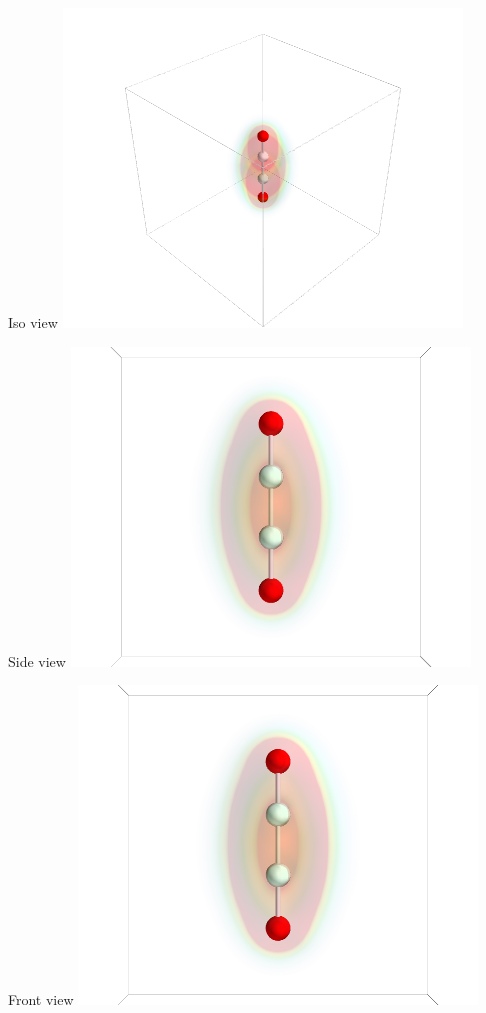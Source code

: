 \documentclass[11pt]{article}
\begin{document}
\begin{itemize}
Iso view
\includegraphics[width=.9\linewidth]{./images/C2H2_iso.png}

Side view
\includegraphics[width=.9\linewidth]{./images/C2H2_side.png}

Front view
\includegraphics[width=.9\linewidth]{./images/C2H2_front.png}



\end{itemize}
\end{document}
